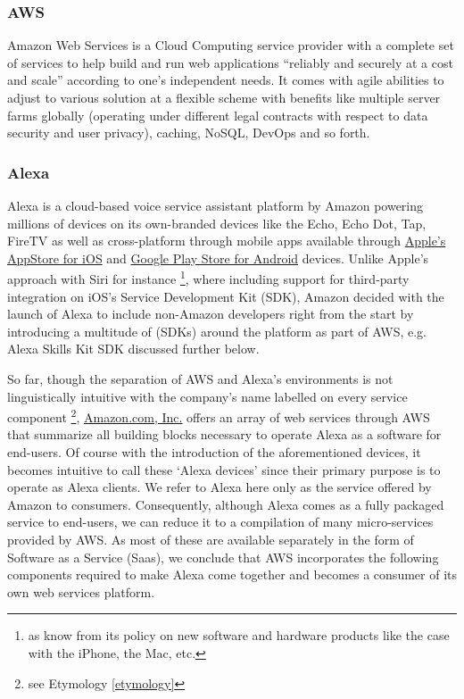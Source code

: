 \subsubsection*{AWS}
Amazon Web Services is a Cloud Computing service provider with a complete set of services to help build and run web applications ``reliably and securely at a cost and scale'' according to one's independent needs. \cite{aws_website}
It comes with agile abilities to adjust to various solution at a flexible scheme with benefits like multiple server farms globally (operating under different legal contracts with respect to data security and user privacy), caching, NoSQL, DevOps and so forth.


\subsubsection*{Alexa}
Alexa is a cloud-based voice service assistant platform by Amazon powering millions of devices  on its own-branded devices like the Echo, Echo Dot, Tap, FireTV as well as cross-platform through mobile apps available through  \href{https://itunes.apple.com/de/app/amazon-alexa/id944011620?l=en&mt=8}{Apple's AppStore for iOS} and  \href{https://play.google.com/store/apps/details?id=com.amazon.dee.app&hl=en}{Google Play Store for Android} devices. Unlike Apple's approach with Siri for instance \footnote{as know from its policy on  new software and hardware products like the case with the iPhone, the Mac, etc.}, where including support for third-party integration on iOS's Service Development Kit (SDK), Amazon decided with the launch of Alexa to include non-Amazon developers right from the start by introducing a multitude of (SDKs) around the platform as part of AWS, e.g. Alexa Skills Kit SDK discussed further below.

So far, though the separation of AWS and Alexa's environments is not linguistically intuitive with the company's name labelled on every service component \footnote{see Etymology \ref{etymology}}, \href{http://www.amazon.com}{Amazon.com, Inc.} offers an array of web services through AWS that summarize all building blocks necessary to operate Alexa as a software for end-users. Of course with the introduction of the aforementioned devices, it becomes intuitive to call these `Alexa devices' since their primary purpose is to operate as Alexa clients. We refer to Alexa here only as the service offered by Amazon to consumers. Consequently, although Alexa comes as a fully packaged service to end-users, we can reduce it to a compilation of many micro-services provided by AWS. As most of these are available separately in the form of Software as a Service (Saas), we conclude that AWS incorporates the following components required to make Alexa come together and becomes a consumer of its own web services platform. 

